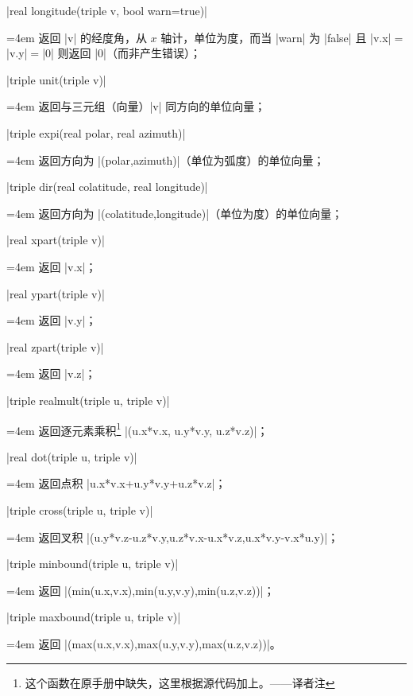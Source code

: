 \documentclass[nofonts,CJKnormalspaces]{ctexbook}[2009/05/20]
\makeatletter
\newenvironment{funclist}{\trivlist
  \parindent=0pt
\item[]
  \def\item{\medskip\par\leftskip=0pt}
  \def\go{\par\leftskip=4em}}
{\endtrivlist}
\newenvironment{typelist}{\itemize
  \let\old@item\@item
  \def\@item[##1]{\expandafter\old@item[\ttfamily\color{type!50!black}##1]}}
{\enditemize}
\newcommand\transnote[1]{\footnote{#1——译者注}}
\makeatother
\begin{document}
\begin{typelist}
\begin{funclist}
\item |real longitude(triple v, bool warn=true)| \go
  返回 |v| 的经度角，从 $x$ 轴计，单位为度，而当 |warn| 为 |false| 且
  |v.x|${}={}$|v.y|${}={}$|0| 则返回 |0|（而非产生错误）；

\item |triple unit(triple v)| \go
  返回与三元组（向量）|v| 同方向的单位向量；

\item |triple expi(real polar, real azimuth)| \go
  返回方向为 |(polar,azimuth)|（单位为弧度）的单位向量；

\item |triple dir(real colatitude, real longitude)| \go
  返回方向为 |(colatitude,longitude)|（单位为度）的单位向量；

\item |real xpart(triple v)| \go
  返回 |v.x|；

\item |real ypart(triple v)| \go
  返回 |v.y|；

\item |real zpart(triple v)| \go
  返回 |v.z|；

\item |triple realmult(triple u, triple v)| \go
  返回逐元素乘积\transnote{这个函数在原手册中缺失，这里根据源代码加上。}
  |(u.x*v.x, u.y*v.y, u.z*v.z)|；

\item |real dot(triple u, triple v)| \go
  返回点积 |u.x*v.x+u.y*v.y+u.z*v.z|；

\item |triple cross(triple u, triple v)| \go
  返回叉积 |(u.y*v.z-u.z*v.y,u.z*v.x-u.x*v.z,u.x*v.y-v.x*u.y)|；

\item |triple minbound(triple u, triple v)| \go
  返回 |(min(u.x,v.x),min(u.y,v.y),min(u.z,v.z))|；

\item |triple maxbound(triple u, triple v)| \go
  返回 |(max(u.x,v.x),max(u.y,v.y),max(u.z,v.z))|。
\end{funclist}


\end{typelist}
\end{document}
